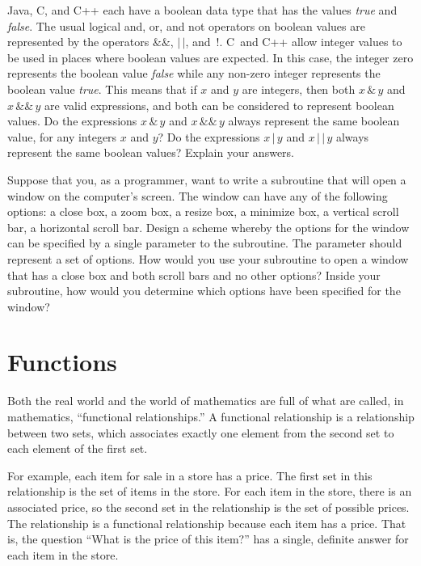 \begin{exercises}
\problem Java, C, and C++ each have a boolean data type that has the values
\textit{true} and \textit{false}.  The usual logical and, or, and not operators
on boolean values are represented by the operators $\&\&$, $|\,|$, and~!.
C~and C++ allow integer values to be used in places where boolean values
are expected.  In this case, the integer zero represents the boolean
value \textit{false} while any non-zero integer represents the boolean
value \textit{true}.  This means that if $x$ and $y$ are integers,
then both $x\,\&\,y$ and $x\,\&\&\,y$ are valid expressions, and both can
be considered to represent boolean values.  Do the expressions
$x\,\&\,y$ and $x\,\&\&\,y$ always represent the same boolean value,
for any integers $x$ and $y$?  Do the expressions $x\,|\,y$ and $x\,|\,|\,y$
always represent the same boolean values?  Explain your answers.

\problem Suppose that you, as a programmer, want to write a subroutine
that will open a window on the computer's screen.  The window can have
any of the following options:  a close box, a zoom box, a resize box, 
a minimize box, a vertical scroll bar, a horizontal scroll bar.
Design a scheme whereby the options for the window can be specified
by a single parameter to the subroutine.  The parameter should represent
a set of options.  How would you use your subroutine to open
a window that has a close box and both scroll bars and no other options?
Inside your subroutine, how would you determine which options have been
specified for the window?


\end{exercises}



\section{Functions}\label{S-sets-4}

Both the real world and the world of mathematics are full of
what are called, in mathematics, ``functional relationships.''
A functional relationship is a relationship between two sets,
which associates exactly one element from the second set to 
each element of the first set.  

For example, each item for sale in a store has a price.
The first set in this relationship is the set of items in the store.  For each
item in the store, there is an associated price, so the
second set in the relationship is the set of possible prices.
The relationship is a functional relationship because 
each item has a price.  That is, the question ``What is the price
of this item?'' has a single, definite answer for each item
in the store.

